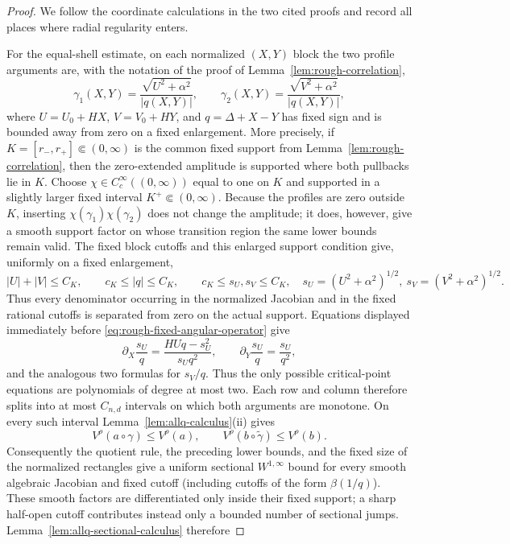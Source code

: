 \documentclass[11pt]{article}
\numberwithin{equation}{section}
\theoremstyle{remark}
\theoremstyle{definition}
\begin{document}
\begin{proof}
We follow the coordinate calculations in the two cited proofs and record
all places where radial regularity enters.

For the equal-shell estimate, on each normalized $(X,Y)$ block the two
profile arguments are, with the notation of the proof of
Lemma~\ref{lem:rough-correlation},
\[
 \gamma_1(X,Y)=\frac{\sqrt{U^2+\alpha^2}}{|q(X,Y)|},
 \qquad
 \gamma_2(X,Y)=\frac{\sqrt{V^2+\alpha^2}}{|q(X,Y)|},
\]
where $U=U_0+HX$, $V=V_0+HY$, and
$q=\Delta+X-Y$ has fixed sign and is bounded away from zero on a fixed
enlargement.  More precisely, if $K=[r_-,r_+]\Subset(0,\infty)$ is the
common fixed support from Lemma~\ref{lem:rough-correlation}, then the
zero-extended amplitude is supported where both pullbacks lie in $K$.
Choose $\chi\in C_c^\infty((0,\infty))$ equal to one on $K$ and supported
in a slightly larger fixed interval $K^+\Subset(0,\infty)$.  Because the
profiles are zero outside $K$, inserting
$\chi(\gamma_1)\chi(\gamma_2)$ does not change the amplitude; it does,
however, give a smooth support factor on whose transition region the same
lower bounds remain valid.  The fixed block cutoffs and this enlarged
support condition give, uniformly on a fixed enlargement,
\[
 |U|+|V|\le C_K,\qquad c_K\le |q|\le C_K,
 \qquad c_K\le s_U,s_V\le C_K,
 \quad s_U=(U^2+\alpha^2)^{1/2},\ s_V=(V^2+\alpha^2)^{1/2}.
\]
Thus every denominator occurring in the normalized Jacobian and in the
fixed rational cutoffs is separated from zero on the actual support.
Equations displayed immediately before
\eqref{eq:rough-fixed-angular-operator} give
\[
 \partial_X\frac{s_U}{q}
  =\frac{HUq-s_U^2}{s_Uq^2},\qquad
 \partial_Y\frac{s_U}{q}=\frac{s_U}{q^2},
\]
and the analogous two formulas for $s_V/q$.  Thus the only possible
critical-point equations are polynomials of degree at most two.  Each row
and column therefore splits into at most $C_{n,d}$ intervals on which both
arguments are monotone. On every such interval
Lemma~\ref{lem:allq-calculus}(ii) gives
\[
 V^\rho(a\circ\gamma)\le V^\rho(a),
 \qquad V^\rho(b\circ\widetilde\gamma)\le V^\rho(b).
\]
Consequently the quotient rule, the preceding lower bounds, and the fixed
size of the normalized rectangles give a uniform sectional
$W^{1,\infty}$ bound for every smooth algebraic Jacobian and fixed cutoff
(including cutoffs of the form $\beta(1/q)$).  These smooth factors are
differentiated only inside their fixed support; a sharp half-open cutoff
contributes instead only a bounded number of sectional jumps.
Lemma~\ref{lem:allq-sectional-calculus} therefore

\end{proof}
\end{document}
